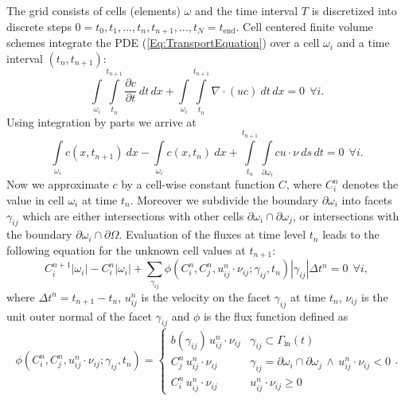 \documentclass[11pt,a4paper,headinclude,footinclude,DIV16,normalheadings]{scrreprt}
\begin{document}
The grid consists of cells (elements) $\omega$ and the time interval
$T$ is discretized into discrete steps $0=t_0, t_1, \ldots, t_n,
t_{n+1},\ldots, t_N=t_{\text{end}}$. Cell centered finite volume schemes
integrate the PDE (\ref{Eq:TransportEquation}) over a cell $\omega_i$
and a time interval $(t_n,t_{n+1})$:
\begin{equation}
\int\limits_{\omega_i}\int\limits_{t_n}^{t_{n+1}}\frac{\partial
  c}{\partial t}\ dt\,dx +
\int\limits_{\omega_i}\int\limits_{t_n}^{t_{n+1}} \nabla\cdot (uc) \
dt\,dx = 0 \ \ \forall i.
\label{Eq:TransportEquationIntegrated}
\end{equation}
Using integration by parts we arrive at
\begin{equation}
\int\limits_{\omega_i} c(x,t_{n+1})\ dx - \int\limits_{\omega_i}
c(x,t_{n})\ dx + \int\limits_{t_n}^{t_{n+1}}
\int\limits_{\partial\omega_i} c u\cdot\nu\ ds\,dt = 0 \ \ \forall i.
\end{equation}
Now we approximate $c$ by a cell-wise constant function $C$, where
$C_i^n$ denotes the value in cell $\omega_i$ at time $t_n$. 
Moreover we subdivide the boundary $\partial\omega_i$ into 
facets $\gamma_{ij}$ which are either intersections with
other cells $\partial\omega_i\cap\partial\omega_j$,
or intersections with the boundary
$\partial\omega_i\cap\partial\Omega$. 
Evaluation of the fluxes
at time level $t_n$ leads to the following equation for the unknown
cell values at $t_{n+1}$:
\begin{equation}
C_i^{n+1}|\omega_i| - C_i^{n}|\omega_i| + \sum\limits_{\gamma_{ij}}
\phi(C_i^n, C_j^n, u_{ij}^n\cdot\nu_{ij}; \gamma_{ij}, t_n )
|\gamma_{ij}| \Delta t^n = 0 \ \ \forall i,
\label{Eq:DiscreteForm}
\end{equation}
where $\Delta t^n=t_{n+1}-t_n$, $u_{ij}^n$ is the velocity on the facet $\gamma_{ij}$ at time
$t_n$, $\nu_{ij}$ is the unit outer normal of the facet $\gamma_{ij}$ and $\phi$ is the flux function defined as
\begin{equation}
\phi(C_i^n, C_j^n, u_{ij}^n\cdot\nu_{ij}; \gamma_{ij}, t_n ) =
\left\{\begin{array}{ll} 
b(\gamma_{ij})\, u_{ij}^n\cdot\nu_{ij} & \gamma_{ij} \subset \Gamma_{\text{in}}(t) \\
C_j^n\, u_{ij}^n\cdot\nu_{ij}&
\gamma_{ij}=\partial\omega_i\cap\partial\omega_j\,\wedge\,u_{ij}^n\cdot\nu_{ij} < 0\\
C_i^n\, u_{ij}^n\cdot\nu_{ij}& u_{ij}^n\cdot\nu_{ij} \geq 0 
\end{array}\right..
\end{equation}
\end{document}
